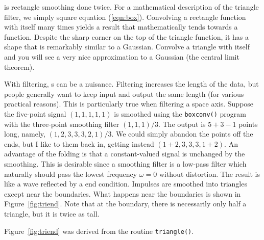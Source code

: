 \par
{} is rectangle smoothing
done twice.  For a mathematical description of the triangle filter, we
simply square equation (\ref{eqn:box}).  Convolving a rectangle
function with itself many times yields a result that mathematically
tends towards a  function.
Despite the sharp corner on the top of the triangle function,
it has a shape that is remarkably similar to a Gaussian. 
Convolve a triangle with itself and you will see a very nice
approximation to a Gaussian (the central limit theorem).
%
\par
%
With filtering, s can be a nuisance.  Filtering
increases the length of the data, but people generally want to keep
input and output the same length (for various practical reasons).
This is particularly true when filtering a space axis.  Suppose the
five-point signal $(1, 1,1,1,1)$ is smoothed using the {\tt boxconv()}
program with the three-point smoothing filter $(1,1,1)/3$.  The output
is $5+3-1$ points long, namely, $(1,2,3,3,3,2,1)/3$.  We could simply
abandon the points off the ends, but I like to  them back in,
getting instead $(1+2,3,3,3,1+2)$.  An advantage of the folding is
that a constant-valued signal is unchanged by the smoothing.  This is
desirable since a smoothing filter is a low-pass filter which
naturally should pass the lowest frequency $\omega=0$ without
distortion.  The result is like a wave reflected by a
 end condition.  Impulses are smoothed
into triangles except near the boundaries.  What happens near the
boundaries is shown in Figure~\ref{fig:triend}.
Note that at the boundary, there is necessarily only half a triangle,
but it is twice as tall.
%
\par
%
Figure~\ref{fig:triend} was derived from the routine {\tt triangle()}. %
